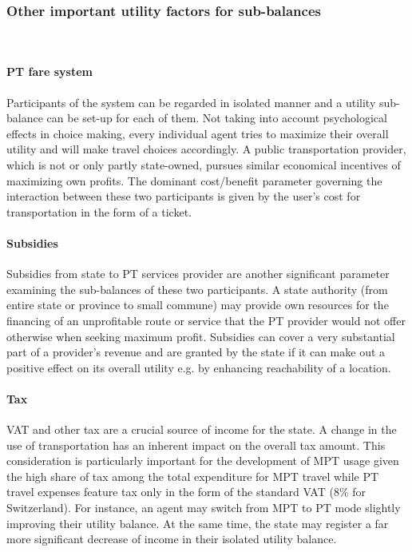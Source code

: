 \subsubsection{Other important utility factors for sub-balances}\mbox{}\\

\paragraph{PT fare system}
	Participants of the system can be regarded in isolated manner and a utility sub-balance can be set-up for each of them. Not taking into account psychological effects in choice making, every individual agent tries to maximize their overall utility and will make travel choices accordingly. A public transportation provider, which is not or only partly state-owned, pursues similar economical incentives of maximizing own profits. The dominant cost/benefit parameter governing the interaction between these two participants is given by the user's cost for transportation in the form of a ticket.
\paragraph{Subsidies}
	Subsidies from state to PT services provider are another significant parameter 	examining the sub-balances of these two participants. A state authority (from entire state or province to small commune) may provide own resources for the financing of an unprofitable route or service that the PT provider would not offer otherwise when seeking maximum profit. Subsidies can cover a very substantial part of a provider's revenue and are granted by the state if it can make out a positive effect on its overall utility e.g. by enhancing reachability of a location.
\paragraph{Tax}	
	VAT and other tax are a crucial source of income for the state. A change in the use of transportation has an inherent impact on the overall tax amount. This consideration is particularly important for the development of MPT usage given the high share of tax among the total expenditure for MPT travel while PT travel expenses feature tax only in the form of the standard VAT (8\% for Switzerland). For instance, an agent may switch from MPT to PT mode slightly improving their utility balance. At the same time, the state may register a far more significant decrease of income in their isolated utility balance.


